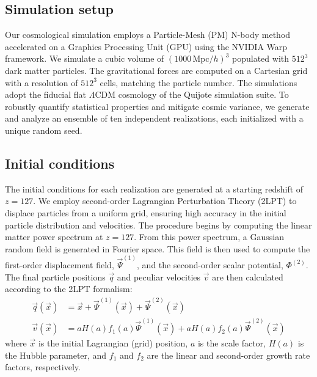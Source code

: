 \documentclass[]{article}
\begin{document}
\subsection{Simulation setup}
Our cosmological simulation employs a Particle-Mesh (PM) N-body method accelerated on a Graphics Processing Unit (GPU) using the NVIDIA Warp framework. We simulate a cubic volume of $(1000 \, \text{Mpc}/h)^3$ populated with $512^3$ dark matter particles. The gravitational forces are computed on a Cartesian grid with a resolution of $512^3$ cells, matching the particle number. The simulations adopt the fiducial flat $\Lambda$CDM cosmology of the Quijote simulation suite. To robustly quantify statistical properties and mitigate cosmic variance, we generate and analyze an ensemble of ten independent realizations, each initialized with a unique random seed.

\subsection{Initial conditions}
The initial conditions for each realization are generated at a starting redshift of $z=127$. We employ second-order Lagrangian Perturbation Theory (2LPT) to displace particles from a uniform grid, ensuring high accuracy in the initial particle distribution and velocities. The procedure begins by computing the linear matter power spectrum at $z=127$. From this power spectrum, a Gaussian random field is generated in Fourier space. This field is then used to compute the first-order displacement field, $\vec{\Psi}^{(1)}$, and the second-order scalar potential, $\Phi^{(2)}$. The final particle positions $\vec{q}$ and peculiar velocities $\vec{v}$ are then calculated according to the 2LPT formalism:
\begin{align}
\vec{q}(\vec{x}) &= \vec{x} + \vec{\Psi}^{(1)}(\vec{x}) + \vec{\Psi}^{(2)}(\vec{x}) \\
\vec{v}(\vec{x}) &= a H(a) f_1(a) \vec{\Psi}^{(1)}(\vec{x}) + a H(a) f_2(a) \vec{\Psi}^{(2)}(\vec{x})
\end{align}
where $\vec{x}$ is the initial Lagrangian (grid) position, $a$ is the scale factor, $H(a)$ is the Hubble parameter, and $f_1$ and $f_2$ are the linear and second-order growth rate factors, respectively.
\end{document}
